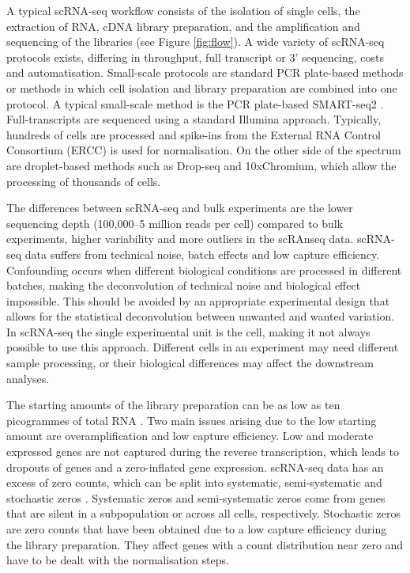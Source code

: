 \documentclass[12pt, a4paper]{article}\usepackage[]{graphicx}\usepackage[]{color}
\begin{document}
A typical scRNA-seq workflow consists of the isolation of single cells, the extraction of RNA, cDNA library preparation, and the amplification and sequencing of the libraries (see Figure {\ref{fig:flow}}). A wide variety of scRNA-seq protocols exists, differing in throughput, full transcript or 3' sequencing, costs and automatisation. Small-scale protocols are standard PCR plate-based methods or methods in which cell isolation and library preparation are combined into one protocol. A typical small-scale method is the PCR plate-based SMART-seq2 \citep{picelli2013smart}. Full-transcripts are sequenced using a standard Illumina approach. Typically, hundreds of cells are processed and spike-ins from the External RNA Control Consortium (ERCC) is used for normalisation. On the other side of the spectrum are droplet-based methods such as Drop-seq and 10xChromium, which allow the processing of thousands of cells.

The differences between scRNA-seq and bulk experiments are the lower sequencing depth (100,000--5 million reads per cell) compared to bulk experiments, higher variability and more outliers in the scRAnseq data. scRNA-seq data suffers from technical noise, batch effects and low capture efficiency. Confounding occurs when different biological conditions are processed in different batches, making the deconvolution of technical noise and biological effect impossible. This should be avoided by an appropriate experimental design that allows for the statistical deconvolution between unwanted and wanted variation. In scRNA-seq the single experimental unit is the cell, making it not always possible to use this approach. Different cells in an experiment may need different sample processing, or their biological differences may affect the downstream analyses.

The starting amounts of the library preparation can be as low as ten picogrammes of total RNA \citep{picelli2013smart}. Two main issues arising due to the low starting amount are  overamplification and low capture efficiency. Low and moderate expressed genes are not captured during the reverse transcription, which leads to dropouts of genes and a zero-inflated gene expression. scRNA-seq data has an excess of zero counts, which can be split into systematic, semi-systematic and stochastic zeros \citep{lun2016pooling}. Systematic zeros and semi-systematic zeros come from genes that are silent in a subpopulation or across all cells, respectively. 
Stochastic zeros are zero counts that have been obtained due to a low capture efficiency during the library preparation. They affect genes with a count distribution near zero and have to be dealt with the normalisation steps.  
 
\end{document}
